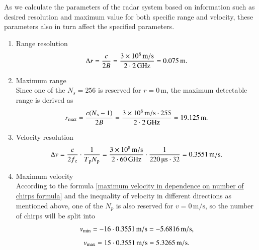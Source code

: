 \documentclass[12pt,DIV14,BCOR12mm,a4paper,footinclude=false,headinclude,parskip=half-,twoside,openright,cleardoublepage=empty,toc=index,bibliography=totoc,listof=totoc]{scrreprt}
\numberwithin{equation}{chapter}
\begin{document}
As we calculate the parameters of the radar system based on information such as desired resolution and maximum value for both specific range and velocity, these parameters also in turn affect the specified parameters.

\begin{enumerate}[start=6]

    \item Range resolution\\
    \begin{equation}
        \centering
        \Delta r = \frac{c}{2B} = \frac{3 \times 10\textsuperscript{8}\,\mathrm{m/s}}{2\cdot 2\,\mathrm{GHz}} = 0.075\,\mathrm{m}.
    \end{equation}

    \item Maximum range\\
    Since one of the $N_s=256$ is reserved for $r=0\,\mathrm{m}$, the maximum detectable range is derived as
    \begin{equation}
        \centering
        r\textsubscript{max} = \frac{c(N\textsubscript{s}-1)}{2B} = \frac{3 \times 10\textsuperscript{8}\,\mathrm{m/s} \cdot 255}{2\cdot 2\,\mathrm{GHz}} = 19.125\,\mathrm{m}.
    \end{equation}

    \item Velocity resolution\\
    \begin{equation}
        \centering
        \Delta v = \frac{c}{2f\textsubscript{c}} \cdot \frac{1}{T\textsubscript{p} N\textsubscript{p}} = \frac{3 \times 10\textsuperscript{8}\,\mathrm{m/s}}{2\cdot 60\,\mathrm{GHz}} \cdot \frac{1}{220\,\text{\textmu s} \cdot 32} = 0.3551\,\mathrm{m/s}.
    \end{equation}

    \item Maximum velocity\\
    According to the formula \ref{maximum velocity in dependence on number of chirps formula} and the inequality of velocity in different directions as mentioned above, one of the $N_p$ is also reserved for $v=0\,\mathrm{m/s}$, so the number of chirps will be split into
    \begin{equation}
        \centering
        v\textsubscript{min} = -16 \cdot 0.3551\,\mathrm{m/s} = -5.6816\,\mathrm{m/s},
    \end{equation}
    \begin{equation}
        v\textsubscript{max} = 15 \cdot 0.3551\,\mathrm{m/s} = 5.3265\,\mathrm{m/s}.
    \end{equation}

\end{enumerate}
\end{document}
